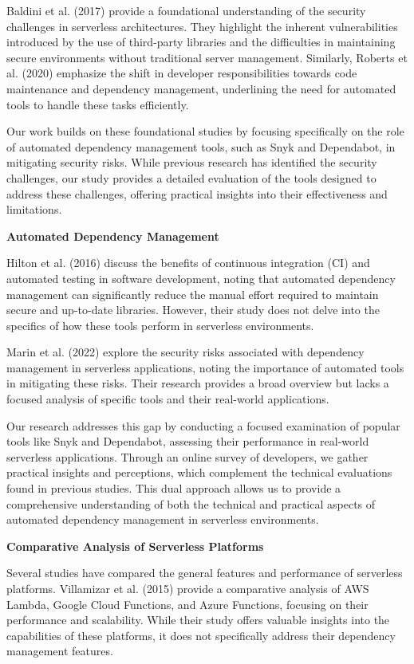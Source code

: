 \documentclass[sigconf]{acmart}
\begin{document}
Baldini et al. (2017) provide a foundational understanding of the security challenges in serverless architectures. They highlight the inherent vulnerabilities introduced by the use of third-party libraries and the difficulties in maintaining secure environments without traditional server management. Similarly, Roberts et al. (2020) emphasize the shift in developer responsibilities towards code maintenance and dependency management, underlining the need for automated tools to handle these tasks efficiently.

Our work builds on these foundational studies by focusing specifically on the role of automated dependency management tools, such as Snyk and Dependabot, in mitigating security risks. While previous research has identified the security challenges, our study provides a detailed evaluation of the tools designed to address these challenges, offering practical insights into their effectiveness and limitations.

\textbf{Automated Dependency Management}

Hilton et al. (2016) discuss the benefits of continuous integration (CI) and automated testing in software development, noting that automated dependency management can significantly reduce the manual effort required to maintain secure and up-to-date libraries. However, their study does not delve into the specifics of how these tools perform in serverless environments.

Marin et al. (2022) explore the security risks associated with dependency management in serverless applications, noting the importance of automated tools in mitigating these risks. Their research provides a broad overview but lacks a focused analysis of specific tools and their real-world applications.

Our research addresses this gap by conducting a focused examination of popular tools like Snyk and Dependabot, assessing their performance in real-world serverless applications. Through an online survey of developers, we gather practical insights and perceptions, which complement the technical evaluations found in previous studies. This dual approach allows us to provide a comprehensive understanding of both the technical and practical aspects of automated dependency management in serverless environments.

\textbf{Comparative Analysis of Serverless Platforms}

Several studies have compared the general features and performance of serverless platforms. Villamizar et al. (2015) provide a comparative analysis of AWS Lambda, Google Cloud Functions, and Azure Functions, focusing on their performance and scalability. While their study offers valuable insights into the capabilities of these platforms, it does not specifically address their dependency management features.
\end{document}
